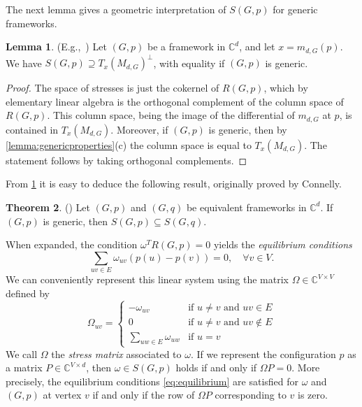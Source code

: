\documentclass[11pt,a4paper,dvipsnames]{scrartcl}
\theoremstyle{definition}
\newtheorem{theorem}{Theorem}[section]
\newtheorem{lemma}[theorem]{Lemma}
\newcommand{\CC}{\mathbb{C}}
\begin{document}
The next lemma gives a geometric interpretation of $S(G,p)$ for generic frameworks.
\begin{lemma}\label{lemma:stresstangentspace}(E.g.,~\cite[Lemma 2.21]{gortler.etal_2010})
    Let $(G,p)$ be a framework in $\CC^d$, and let $x = m_{d,G}(p)$. We have $S(G,p) \supseteq {T_x(M_{d,G})}^\perp$, with equality if $(G,p)$ is generic. 
\end{lemma}
\begin{proof}
    The space of stresses is just the cokernel of $R(G,p)$, which by elementary linear algebra is the orthogonal complement of the column space of $R(G,p)$. This column space, being the image of the differential of $m_{d,G}$ at $p$, is contained in $T_x(M_{d,G})$. Moreover, if $(G,p)$ is generic, then by \cref{lemma:genericproperties}(c) the column space is equal to $T_{x}(M_{d,G})$. The statement follows by taking orthogonal complements.
\end{proof}

From \cref{lemma:stresstangentspace} it is easy to deduce the following result, originally proved by Connelly.

\begin{theorem}\label{theorem:connelly} (\cite{connelly_2005})
    Let $(G,p)$ and $(G,q)$ be equivalent frameworks in $\CC^d$. If $(G,p)$ is generic, then $S(G,p) \subseteq S(G,q)$. %
\end{theorem}

When expanded, the condition $\omega^T R(G,p) = 0$ yields the \emph{equilibrium conditions} 
\begin{equation}\label{eq:equilibrium}
    \sum_{uv \in E}\omega_{uv}(p(u) - p(v)) = 0, \hspace{1em} \forall v \in V.
\end{equation}
We can conveniently represent this linear system using the matrix $\Omega \in \CC^{V \times V}$ defined by
\[\Omega_{uv} = \begin{cases}
- \omega_{uv} & \text{if } u \neq v \text{ and } uv \in E \\ 0 & \text{if } u \neq v \text{ and } uv \notin E \\ {\displaystyle \sum_{uw \in E}} \omega_{uw} & \text{if } u = v
\end{cases}\]
We call $\Omega$ the \emph{stress matrix} associated to $\omega$. If we represent the configuration $p$ as a matrix $P \in \CC^{V \times d}$, then $\omega \in S(G,p)$ holds if and only if $\Omega P = 0$. More precisely, the equilibrium conditions \cref{eq:equilibrium} are satisfied for $\omega$ and $(G,p)$ at vertex $v$ if and only if the row of $\Omega P$ corresponding to $v$ is zero. %
\end{document}
